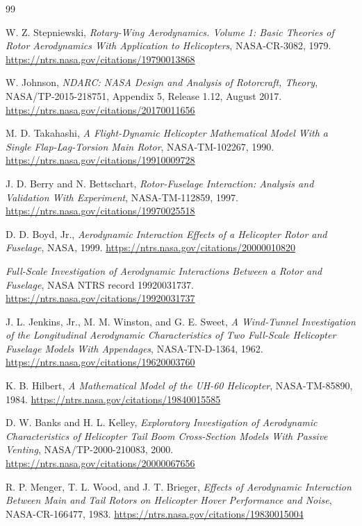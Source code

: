 \documentclass[12pt,a4paper]{article}
\begin{document}
\begin{thebibliography}{99}

W. Z. Stepniewski,
\textit{Rotary-Wing Aerodynamics. Volume 1: Basic Theories of Rotor Aerodynamics With Application to Helicopters},
NASA-CR-3082, 1979.
\url{https://ntrs.nasa.gov/citations/19790013868}

W. Johnson,
\textit{NDARC: NASA Design and Analysis of Rotorcraft, Theory},
NASA/TP-2015-218751, Appendix 5, Release 1.12, August 2017.
\url{https://ntrs.nasa.gov/citations/20170011656}

M. D. Takahashi,
\textit{A Flight-Dynamic Helicopter Mathematical Model With a Single Flap-Lag-Torsion Main Rotor},
NASA-TM-102267, 1990.
\url{https://ntrs.nasa.gov/citations/19910009728}

J. D. Berry and N. Bettschart,
\textit{Rotor-Fuselage Interaction: Analysis and Validation With Experiment},
NASA-TM-112859, 1997.
\url{https://ntrs.nasa.gov/citations/19970025518}

D. D. Boyd, Jr.,
\textit{Aerodynamic Interaction Effects of a Helicopter Rotor and Fuselage},
NASA, 1999.
\url{https://ntrs.nasa.gov/citations/20000010820}

\textit{Full-Scale Investigation of Aerodynamic Interactions Between a Rotor and Fuselage},
NASA NTRS record 19920031737.
\url{https://ntrs.nasa.gov/citations/19920031737}

J. L. Jenkins, Jr., M. M. Winston, and G. E. Sweet,
\textit{A Wind-Tunnel Investigation of the Longitudinal Aerodynamic Characteristics of Two Full-Scale Helicopter Fuselage Models With Appendages},
NASA-TN-D-1364, 1962.
\url{https://ntrs.nasa.gov/citations/19620003760}

K. B. Hilbert,
\textit{A Mathematical Model of the UH-60 Helicopter},
NASA-TM-85890, 1984.
\url{https://ntrs.nasa.gov/citations/19840015585}

D. W. Banks and H. L. Kelley,
\textit{Exploratory Investigation of Aerodynamic Characteristics of Helicopter Tail Boom Cross-Section Models With Passive Venting},
NASA/TP-2000-210083, 2000.
\url{https://ntrs.nasa.gov/citations/20000067656}

R. P. Menger, T. L. Wood, and J. T. Brieger,
\textit{Effects of Aerodynamic Interaction Between Main and Tail Rotors on Helicopter Hover Performance and Noise},
NASA-CR-166477, 1983.
\url{https://ntrs.nasa.gov/citations/19830015004}


\end{thebibliography}
\end{document}
